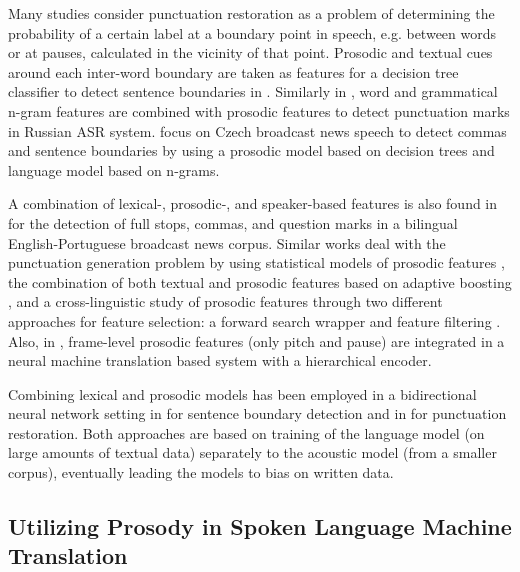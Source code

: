 Many studies consider punctuation restoration as a problem of determining the probability of a certain label at a boundary point in speech, e.g. between words or at pauses, calculated in the vicinity of that point. Prosodic and textual cues around each inter-word boundary are taken as features for a decision tree classifier to detect sentence boundaries in \cite{liu2006study}. Similarly in \cite{khomitsevich2015combining}, word and grammatical n-gram features are combined with prosodic features to detect punctuation marks in Russian ASR system. \cite{Psutka04automaticpunctuation} focus on Czech broadcast news speech to detect commas and sentence boundaries by using a prosodic model based on decision trees and language model based on n-grams. 

A combination of lexical-, prosodic-, and speaker-based features is also found in \cite{batista2012bilingual} for the detection of full stops, commas, and question marks in a bilingual English-Portuguese broadcast news corpus. Similar works deal with the punctuation generation problem by using statistical models of prosodic features \citep{Christensen01punctuationannotation}, the combination of both textual and prosodic features based on adaptive boosting \citep{kolar2012development}, and a cross-linguistic study of prosodic features through two different approaches for feature selection: a forward search wrapper and feature filtering \citep{fung2007cross}. Also, in \cite{Klejch}, frame-level prosodic features (only pitch and pause) are integrated in a neural machine translation based system with a hierarchical encoder.

Combining lexical and prosodic models has been employed in a bidirectional neural network setting in \cite{Xu2017} for sentence boundary detection and in \cite{tilk2016bidirectional} for punctuation restoration. Both approaches are based on training of the language model (on large amounts of textual data) separately to the acoustic model (from a smaller corpus), eventually leading the models to bias on written data. 

\subsection{Utilizing Prosody in Spoken Language Machine Translation}
\label{sota:prosody_in_smt}


